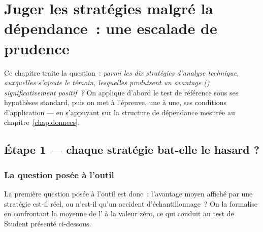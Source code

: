 \chapter{Juger les stratégies malgré la dépendance~: une escalade de prudence}
\label{chap:juger}
\label{chap:bloc1} %

Ce chapitre traite la question~: \emph{parmi les dix stratégies d'analyse
technique, auxquelles s'ajoute le témoin, lesquelles produisent un avantage
(\edgevar) significativement
positif~?} On applique d'abord le test de référence sous ses hypothèses
standard, puis on met à l'épreuve, une à une, ses conditions
d'application — en s'appuyant sur la structure de dépendance mesurée au
chapitre~\ref{chap:donnees}.

\section{Étape 1 --- chaque stratégie bat-elle le hasard ?}
\label{sec:b1-etape1}

\subsection{La question posée à l'outil}

La première question posée à l'outil est donc~: l'avantage moyen affiché
par une stratégie est-il réel, ou n'est-il qu'un accident
d'échantillonnage~? On la formalise en confrontant la moyenne de
l'\edgevar{} à la valeur zéro, ce qui conduit au test de Student présenté
ci-dessous.

